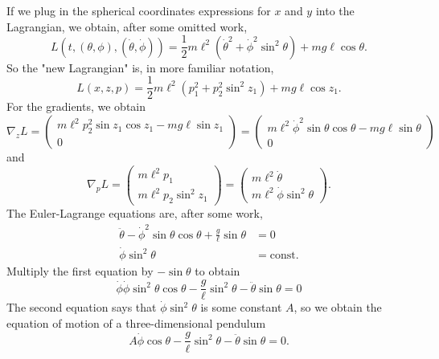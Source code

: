 \documentclass[11pt]{book}
\begin{document}
\begin{enumerate}
If we plug in the spherical coordinates expressions for $x$ and $y$ into the Lagrangian, we obtain, after some omitted work,
\[
L \left(t, (\theta, \phi), (\dot{\theta}, \dot{\phi}) \right) = \frac{1}{2} m \ell^2 \left( \dot{\theta}^2 + \dot{\phi}^2 \sin^2 \theta \right) + m g \ell \cos \theta.
\]
So the "new Lagrangian" is, in more familiar notation,
\[
L(x,z,p) = \frac{1}{2} m \ell^2 \left( p_1^2 + p_2^2 \sin^2 z_1 \right) + mg \ell \cos z_1.
\]
For the gradients, we obtain
\[
\nabla_z L = \begin{pmatrix}
m \ell^2 p_2^2 \sin z_1 \cos z_1 - mg \ell \sin z_1 \\ 0
\end{pmatrix} = \begin{pmatrix}
m \ell^2 \dot{\phi}^2 \sin \theta \cos \theta - mg \ell \sin \theta \\ 0
\end{pmatrix}
\]
and
\[
\nabla_p L = \begin{pmatrix}
m \ell^2 p_1 \\
m \ell^2 p_2 \sin^2 z_1
\end{pmatrix} = \begin{pmatrix}
m \ell^2 \dot{\theta} \\
m \ell^2 \dot{\phi} \sin^2 \theta
\end{pmatrix}.
\]
The Euler-Lagrange equations are, after some work,
\begin{align*}
\ddot{\theta} - \dot{\phi}^2 \sin \theta \cos \theta + \frac{g}{\ell} \sin \theta &= 0 \\
\dot{\phi} \sin^2 \theta &= \mathrm{const}.
\end{align*}
Multiply the first equation by $-\sin \theta$ to obtain
\[
\dot{\phi} \dot{\phi} \sin^2 \theta \cos \theta - \frac{g}{\ell} \sin^2  \theta - \ddot{\theta} \sin{\theta} = 0
\]
The second equation says that $\dot{\phi} \sin^2 \theta$ is some constant $A$, so we obtain the equation of motion of a three-dimensional pendulum
\[
\boxed{A \dot{\phi} \cos \theta - \frac{g}{\ell} \sin^2 \theta - \ddot{\theta} \sin \theta = 0.}
\]


\end{enumerate}
\end{document}
